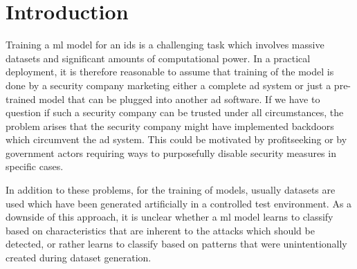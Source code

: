 \documentclass[10pt,sigconf,letterpaper,dvipsnames]{acmart}
\begin{document}

\maketitle

\section{Introduction}

Training a \gls{ml} model for an \gls{ids} is a challenging task which involves massive datasets and significant amounts of computational power. In a practical deployment, it is therefore reasonable to assume that training of the model is done by a security company marketing either a complete \gls{ad} system or just a pre-trained model that can be plugged into another \gls{ad} software. %
If we have to question if such a security company can be trusted under all circumstances, the problem arises that the security company might have implemented backdoors which circumvent the \gls{ad} system. This could be motivated by profitseeking or by government actors requiring ways to purposefully disable security measures in specific cases.

In addition to these problems, for the training of models, usually datasets are used which have been generated artificially in a controlled test environment. As a downside of this approach, it is unclear whether a \gls{ml} model learns to classify based on characteristics that are inherent to the attacks which should be detected, or rather learns to classify based on patterns that were unintentionally created during dataset generation.
\end{document}
